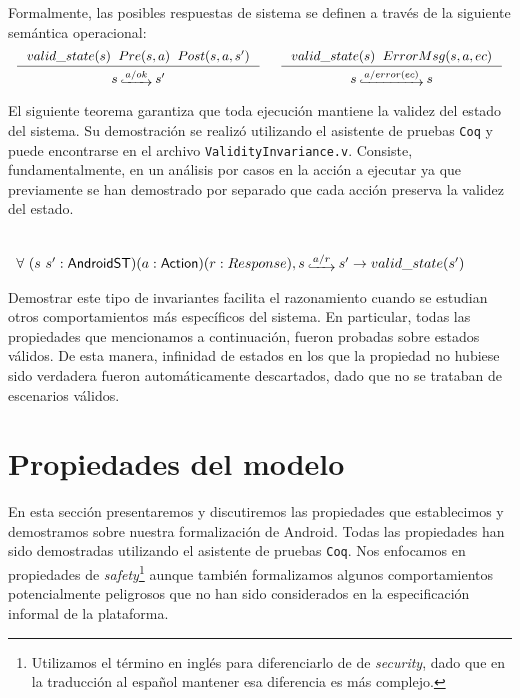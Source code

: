 Formalmente, las posibles respuestas de sistema se definen a través de la siguiente semántica
operacional:
\begin{displaymath}
    \begin{array}{c}
        \inference[]{$$valid\_state(s)$$ \hspace{.2cm} $$Pre(s, a)$$ \hspace{.2cm} $$Post(s, a, s')$$}{$$s\step{a/ok}s'$$}
        \hspace{0.5cm}
        \inference[]{$$valid\_state(s)$$ \hspace{.2cm} $$ErrorMsg(s, a, ec)$$}{$$s\step{a/error(ec)}s$$}
    \end{array}
\end{displaymath}

El siguiente teorema garantiza que toda ejecución mantiene la validez del estado del sistema. Su
demostración se realizó utilizando el asistente de pruebas \texttt{Coq} y puede encontrarse en el
archivo \texttt{ValidityInvariance.v}. Consiste, fundamentalmente, en un análisis por casos en la
acción a ejecutar ya que previamente se han demostrado por separado que cada acción preserva la
validez del estado.

\begin{theorem} 
    \label{lemma:valid-state-correct}
    \mbox{}\\
    $\begin{array}{l} \forall\ (s\ s':\AndroidState)(a:\Action) (r:Response), s\step{a/r}s'
            \rightarrow valid\_state(s')\end{array}$
\end{theorem}

Demostrar este tipo de invariantes facilita el razonamiento cuando se estudian otros comportamientos
más específicos del sistema. En particular, todas las propiedades que mencionamos a continuación,
fueron probadas sobre estados válidos. De esta manera, infinidad de estados en los que la propiedad
no hubiese sido verdadera fueron automáticamente descartados, dado que no se trataban de escenarios
válidos.

\section{Propiedades del modelo}
\label{section:formalization:properties}

En esta sección presentaremos y discutiremos las propiedades que establecimos y demostramos sobre
nuestra formalización de Android. Todas las propiedades han sido demostradas utilizando el asistente
de pruebas \texttt{Coq}. Nos enfocamos en propiedades de \textit{safety}\footnote{Utilizamos el
    término en inglés para diferenciarlo de de \textit{security}, dado que en la traducción al español
    mantener esa diferencia es más complejo.} aunque también formalizamos algunos comportamientos
potencialmente peligrosos que no han sido considerados en la especificación informal de la
plataforma.

